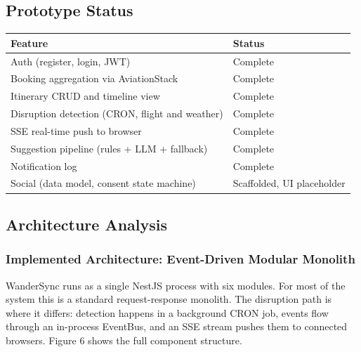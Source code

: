 \documentclass[12pt,a4paper]{article}
\begin{document}
\subsection{Prototype Status}

\begin{tabularx}{\textwidth}{@{}lX@{}}
\toprule
\textbf{Feature} & \textbf{Status} \\
\midrule
Auth (register, login, JWT) & \textcolor{successgreen}{Complete} \\
Booking aggregation via AviationStack & \textcolor{successgreen}{Complete} \\
Itinerary CRUD and timeline view & \textcolor{successgreen}{Complete} \\
Disruption detection (CRON, flight and weather) & \textcolor{successgreen}{Complete} \\
SSE real-time push to browser & \textcolor{successgreen}{Complete} \\
Suggestion pipeline (rules + LLM + fallback) & \textcolor{successgreen}{Complete} \\
Notification log & \textcolor{successgreen}{Complete} \\
Social (data model, consent state machine) & \textcolor{warningorange}{Scaffolded, UI placeholder} \\
\bottomrule
\end{tabularx}

\subsection{Architecture Analysis}

\subsubsection{Implemented Architecture: Event-Driven Modular Monolith}

WanderSync runs as a single NestJS process with six modules. For most of the system this is a
standard request-response monolith. The disruption path is where it differs: detection happens in
a background CRON job, events flow through an in-process EventBus, and an SSE stream pushes them
to connected browsers. Figure 6 shows the full component structure.
\end{document}
